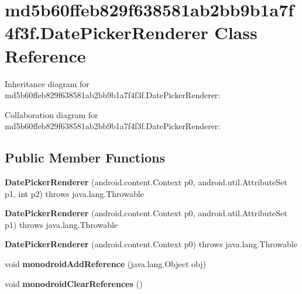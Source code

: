 \hypertarget{classmd5b60ffeb829f638581ab2bb9b1a7f4f3f_1_1_date_picker_renderer}{}\section{md5b60ffeb829f638581ab2bb9b1a7f4f3f.\+Date\+Picker\+Renderer Class Reference}
\label{classmd5b60ffeb829f638581ab2bb9b1a7f4f3f_1_1_date_picker_renderer}


Inheritance diagram for md5b60ffeb829f638581ab2bb9b1a7f4f3f.\+Date\+Picker\+Renderer\+:


Collaboration diagram for md5b60ffeb829f638581ab2bb9b1a7f4f3f.\+Date\+Picker\+Renderer\+:
\subsection*{Public Member Functions}
\begin{DoxyCompactItemize}
\item 
\mbox{\label{classmd5b60ffeb829f638581ab2bb9b1a7f4f3f_1_1_date_picker_renderer_a9c9f3897fd07153d0786f2c0cd7f9137}} 
{\bfseries Date\+Picker\+Renderer} (android.\+content.\+Context p0, android.\+util.\+Attribute\+Set p1, int p2)  throws java.\+lang.\+Throwable 	
\item 
\mbox{\label{classmd5b60ffeb829f638581ab2bb9b1a7f4f3f_1_1_date_picker_renderer_ade65698654faac1638d89be69a76bf07}} 
{\bfseries Date\+Picker\+Renderer} (android.\+content.\+Context p0, android.\+util.\+Attribute\+Set p1)  throws java.\+lang.\+Throwable 	
\item 
\mbox{\label{classmd5b60ffeb829f638581ab2bb9b1a7f4f3f_1_1_date_picker_renderer_ae5cb2d0f611ae56a000a816dff6a4b6d}} 
{\bfseries Date\+Picker\+Renderer} (android.\+content.\+Context p0)  throws java.\+lang.\+Throwable 	
\item 
\mbox{\label{classmd5b60ffeb829f638581ab2bb9b1a7f4f3f_1_1_date_picker_renderer_a3beb2afa3ed98862669dcc1fe7d6307c}} 
void {\bfseries monodroid\+Add\+Reference} (java.\+lang.\+Object obj)
\item 
\mbox{\label{classmd5b60ffeb829f638581ab2bb9b1a7f4f3f_1_1_date_picker_renderer_a272024ba18637be81cb9cd68055ccc07}} 
void {\bfseries monodroid\+Clear\+References} ()
\end{DoxyCompactItemize}

